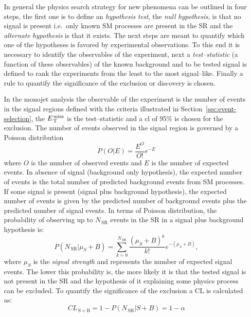 In general the physics search strategy for new phenomena can be outlined in four
steps, the first one is to define an \emph{hypothesis test}, the \emph{null
  hypothesis}, is that no signal is present i.e.~only known SM processes are
present in the SR and the \emph{alternate hypothesis} is that it exists. The
next steps are meant to quantify which one of the hypotheses is favored by
experimental observations. To this end it is necessary to identify the
observables of the experiment, next a \emph{test--statistic} (a function of
these observables) of the known background and to be tested signal is defined to
rank the experiments from the least to the most signal--like. Finally a rule to
quantify the significance of the exclusion or discovery is chosen.

In the monojet analysis the observable of the experiment is the number of events
in the signal regions defined with the criteria illustrated in
Section~\ref{sec:event-selection}, the $E_\mathrm{\, T}^\mathrm{\, miss}$ is the test--statistic and a
\gls{cl} of 95\% is chosen for the exclusion. The number of events observed in
the signal region is governed by a Poisson distribution
\begin{equation}
  \label{eq:86}
  P(O|E) = \frac{E^O }{O!} e^{- E}
\end{equation}
where $O$ is the number of observed events and $E$ is the number of expected
events. In absence of signal (background only hypothesis), the expected number
of events is the total number of predicted background events from SM
processes. If some signal is present (signal plus background hypothesis), the
expected number of events is given by the predicted number of background events
plus the predicted number of signal events. In terms of Poisson distribution,
the probability of observing up to $N_\mathrm{\, SR}$ events in the SR in a
signal plus background hypothesis is:
\begin{equation}
  \label{eq:87}
  P(N_\mathrm{\, SR}|\mu_S + B) = \sum^{N_\mathrm{\, SR}}_{k = 0} \frac{(\mu_S + B)^k}{k!}
  e^{- (\mu_S + B)},
\end{equation}
where $\mu_S$ is the \emph{signal strength} and represents the number of
expected signal events. The lower this probability is, the more likely it is
that the tested signal is not present in the SR and the hypothesis of it
explaining some physics process can be excluded. To quantify the significance of
the exclusion a CL is calculated as:
\begin{equation}
  \label{eq:88}
  CL_\mathrm{\, S+B} = 1 - P(N_\mathrm{\, SR}|S+B) = 1 - \alpha
\end{equation}
